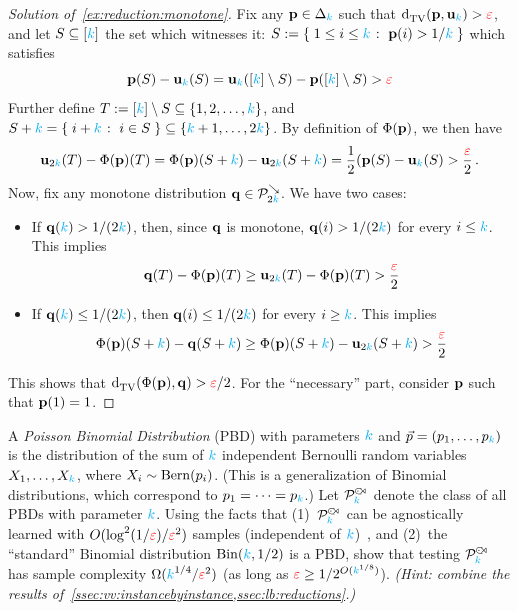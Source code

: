 \begin{proof}[Solution of~\cref{ex:reduction:monotone}]
Fix any $\mathbf{p}\in\Delta_{{\textcolor{cyan}{k}}}$ such that $\totalvardist{\p}{\uniform_\ab}>\dst$, and let $S\subseteq [{\textcolor{cyan}{k}}]$ the set which witnesses it:
$S\eqdef \setOfSuchThat{ 1\leq i\leq \ab }{\p(i)> 1/\ab }$ 
which satisfies 
\[
	\mathbf{p}(S)-\mathbf{u}_{\textcolor{cyan}{k}}(S) = \mathbf{u}_{\textcolor{cyan}{k}}([{\textcolor{cyan}{k}}]\setminus S)- \mathbf{p}([{\textcolor{cyan}{k}}]\setminus S) >\textcolor{red}{\varepsilon}
\]
Further define $T := [{\textcolor{cyan}{k}}]\setminus S \subseteq \{1,2,\dots,{\textcolor{cyan}{k}}\}$, and $S+\ab = \setOfSuchThat{i+\ab}{i\in S} \subseteq \{\ab+1,\dots,2\ab\}$. 
By definition of $\Phi(\mathbf{p})$, we then have
\[
	\mathbf{u}_{2{\textcolor{cyan}{k}}}(T)-\Phi(\mathbf{p})(T)=\Phi(\mathbf{p})(S+{\textcolor{cyan}{k}})-\mathbf{u}_{2{\textcolor{cyan}{k}}}(S+{\textcolor{cyan}{k}})= \frac{1}{2}(\mathbf{p}(S)-\mathbf{u}_{\textcolor{cyan}{k}}(S)>\frac{\textcolor{red}{\varepsilon}}{2}\,.
\]
Now, fix any monotone distribution $\mathbf{q}\in\mathcal{P}^{\searrow}_{2{\textcolor{cyan}{k}}}$. We have two cases:
\begin{itemize}
\item If $\mathbf{q}({\textcolor{cyan}{k}}) > 1/(2{\textcolor{cyan}{k}})$, then, since $\mathbf{q}$ is monotone, $\mathbf{q}(i) > 1/(2{\textcolor{cyan}{k}})$ for every $i \leq {\textcolor{cyan}{k}}$. This implies
\[
	\mathbf{q}(T)-\Phi(\mathbf{p})(T) \geq \mathbf{u}_{2{\textcolor{cyan}{k}}}(T)-\Phi(\mathbf{p})(T) > \frac{\textcolor{red}{\varepsilon}}{2}
\]
\item If $\mathbf{q}({\textcolor{cyan}{k}}) \leq 1/(2{\textcolor{cyan}{k}})$, then $\mathbf{q}(i) \leq 1/(2{\textcolor{cyan}{k}})$ for every $i \geq {\textcolor{cyan}{k}}$. This implies
\[
	\Phi(\mathbf{p})(S+{\textcolor{cyan}{k}})-\mathbf{q}(S+{\textcolor{cyan}{k}}) \geq \Phi(\mathbf{p})(S+{\textcolor{cyan}{k}})-\mathbf{u}_{2{\textcolor{cyan}{k}}}(S+{\textcolor{cyan}{k}}) > \frac{\textcolor{red}{\varepsilon}}{2}
\]
\end{itemize}
This shows that $\totalvardist{\Phi(\p)}{\q} > \dst/2$. For the ``necessary'' part, consider $\mathbf{p}$ such that $\mathbf{p}(1)=1$.
\end{proof}
\fi  %
\begin{question}\label{ex:testing:pbd}
\newcommand{\pbd}{\hspace{1pt}{\cdot}\kern -4pt {\subset}\kern -3pt {\rtimes}}
  A \emph{Poisson Binomial Distribution} (PBD) with parameters ${\textcolor{cyan}{k}}$ and $\vec{p}=(p_1,\dots,p_{\textcolor{cyan}{k}})$ is the distribution of the sum of ${\textcolor{cyan}{k}}$ independent Bernoulli random variables $X_1,\dots,X_{\textcolor{cyan}{k}}$, where $X_i \sim \operatorname{Bern}( p_i ) $. (This is a generalization of Binomial distributions, which correspond to $p_1=\dots=p_{\textcolor{cyan}{k}}$.) Let $\property^{\pbd}_{\ab}$ denote the class of all PBDs with parameter ${\textcolor{cyan}{k}}$. Using the facts that (1)~$\property^{\pbd}_{\ab}$ can be agnostically learned with $O(\log^2(1/\textcolor{red}{\varepsilon})/\textcolor{red}{\varepsilon}^2)$ samples (independent of ${\textcolor{cyan}{k}}$)~\citep{DDS:PBD:15}, and (2)~the ``standard'' Binomial distribution $\binomial{\ab}{1/2}$ is a PBD, show that testing $\property^{\pbd}_{\ab}$ has sample complexity $\Omega({\textcolor{cyan}{k}}^{1/4}/\textcolor{red}{\varepsilon}^2)$ (as long as $\textcolor{red}{\varepsilon} \geq 1/2^{O({\textcolor{cyan}{k}}^{1/8})}$). \textit{(Hint: combine the results of~\cref{ssec:vv:instancebyinstance,ssec:lb:reductions}.)}
\end{question}